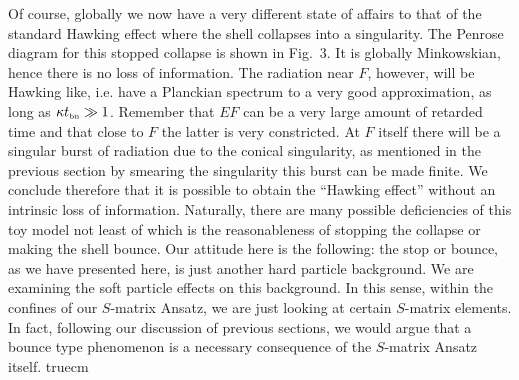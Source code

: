 Of course, globally we now have a very different state of affairs to
that of the standard Hawking effect where the shell collapses into a
singularity. The Penrose diagram for this stopped collapse is shown in
Fig.~3.  It is globally Minkowskian, hence there is no loss of
information. The radiation near $F$, however, will be Hawking like,
i.e.  have a Planckian spectrum to a very good approximation, as long
as $\kappa t_{\scriptscriptstyle{\rm bn}}\gg1$.  Remember that $EF$ can be a very large amount of
retarded time and that close to $F$ the latter is very constricted.  At
$F$ itself there will be a singular burst of radiation due to the
conical singularity, as mentioned in the previous section by smearing
the singularity this burst can be made finite. We conclude therefore
that it is possible to obtain the ``Hawking effect'' without an
intrinsic loss of information.  Naturally, there are many possible
deficiencies of this toy model not least of which is the reasonableness
of stopping the collapse or making the shell bounce. Our attitude here
is the following: the stop or bounce, as we have presented here, is
just another hard particle background. We are examining the soft
particle effects on this background.  In this sense, within the
confines of our $S$-matrix Ansatz, we are just looking at certain
$S$-matrix elements.  In fact, following our discussion of previous
sections, we would argue that a bounce type phenomenon is a necessary
consequence of the $S$-matrix Ansatz itself.
\midinsert
{} truecm


